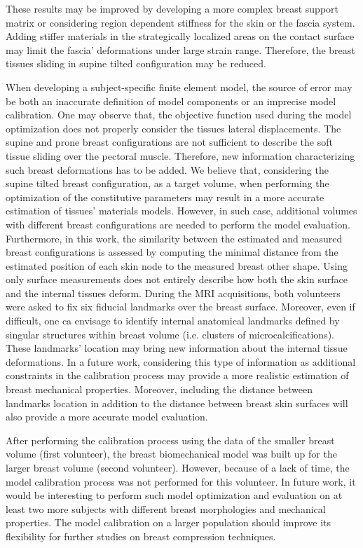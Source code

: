  These results may be improved by developing a more complex breast support matrix or considering region dependent stiffness for the skin or the fascia system. Adding stiffer materials in the strategically localized areas on the contact surface may limit the fascia' deformations under large strain range. Therefore, the breast tissues sliding in supine tilted configuration may be reduced.
 
When developing a subject-specific finite element model, the source of error may be both an inaccurate definition of model components or an imprecise model calibration. One may observe that, the objective function used during the model optimization does not properly consider the tissues lateral displacements. The supine and prone breast configurations are not sufficient to describe the soft tissue sliding over the pectoral muscle. Therefore, new information characterizing such breast deformations has to be added. We believe that, considering the supine tilted breast configuration, as a target volume, when performing the optimization of the constitutive parameters  may result in a more accurate estimation of tissues' materials models. However, in such case, additional volumes with different breast configurations are needed to perform the model evaluation. Furthermore, in this work, the similarity between the estimated and measured breast configurations is assessed by computing the minimal distance from the estimated position of each skin node to the measured breast other shape.  Using only surface measurements does not entirely describe how both the skin surface and the internal tissues deform. During the MRI acquisitions, both volunteers were asked to fix six fiducial landmarks over the breast surface. Moreover, even if difficult, one ca envisage to identify internal anatomical landmarks defined by singular structures within breast volume (i.e. clusters of microcalcifications). These landmarks' location may bring new information about the internal tissue deformations. In a future work, considering this type of information as additional constraints in the calibration process may provide a more realistic estimation of breast mechanical properties. Moreover, including the distance between landmarks location in addition to the distance between breast skin surfaces will also provide a more accurate model evaluation. 

After performing the calibration process using the data of the smaller breast volume (first volunteer), the breast biomechanical model was built up for the larger breast volume (second volunteer). However, because of a lack of time,  the model calibration process was not performed for this volunteer. In future work, it would be interesting to perform such model optimization and evaluation on at least two more subjects with different breast morphologies and mechanical properties. The model calibration on a larger population should improve its flexibility for further studies on breast compression techniques.

